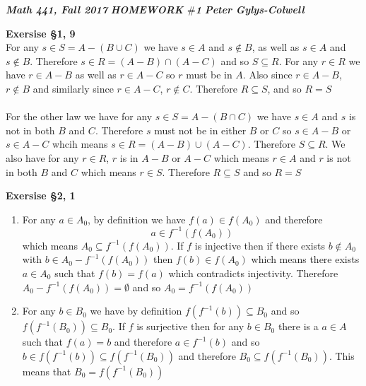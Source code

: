 \documentclass[12pt]{article}
\newenvironment{ques}[1]{\textbf{Exersise #1}\vspace{1 mm}\\ }{\bigskip}
\theoremstyle{definition}
\begin{document}
\noindent \textit{\textbf{Math 441, Fall 2017}} \hspace{1.3cm}
\textit{\textbf{HOMEWORK $\#$1}} \hspace{1.3cm} \textit{\textbf{Peter
Gylys-Colwell}} 

\vspace{1cm}

\begin{ques}{\S 1, 9}
	For any $s \in S = A - (B \cup C)$ we have $s \in A$ and $s \notin B$,
	as well as $s \in A$ and $s\notin B$. Therefore $s \in R = (A - B) \cap
	(A - C)$ and so $S \subseteq R$. For any $r \in R$ we have $r \in A -
	B$ as well as $r \in A-C$ so $r$ must be in $A$. Also since $r \in
	A-B$, $r \notin B$ and similarly since $r \in A-C$, $r\notin C$.
	Therefore $R \subseteq S$, and so $R = S$\\ 
	\\
	For the other law we have
	for any $s \in S = A- (B\cap C)$ we have $s \in A$ and $s$ is not in
	both $B$ and $C$. Therefore $s$ must not be in either $B$ or $C$ so $s
	\in A-B$ or $s \in A-C$ whcih means $s \in R = (A-B)\cup (A-C)$.
	Therefore $S \subseteq R$. We also have for any $r \in R$, $r$ is in $A
	- B$ or $A -C$ which means $r \in A$ and $r$ is not in both $B$ and $C$
	which means $r \in S$. Therefore $R \subseteq S$ and so $R = S$

\end{ques}

\begin{ques}{\S 2, 1}
	\begin{enumerate}
		\item
			For any $a \in A_0$, by definition we have $f(a) \in f(A_0)$ and therefore 
			$$a \in f^{-1}(f(A_0))$$
			which means $A_0 \subseteq f^{-1}(f(A_0))$. If $f$ is
			injective then if there exists $b \notin A_0$ with $b
			\in A_0 - f^{-1}(f(A_0))$ then $f(b) \in f(A_0)$ which
			means there exists $a \in A_0$ such that $f(b) = f(a)$
			which contradicts injectivity. Therefore $A_0 -
			f^{-1}(f(A_0)) = \emptyset$ and so $A_0 =
			f^{-1}(f(A_0))$

		\item
			For any $b \in B_0$ we have by definition $f(f^{-1}(b))
			\subseteq B_0$ and so $f(f^{-1}(B_0)) \subseteq B_0$.
			If $f$ is surjective then for any $b \in B_0$ there is
			a $a \in A$ such that $f(a) = b$ and therefore $a \in
			f^{-1}(b)$ and so $b \in f(f^{-1}(b)) \subseteq
			f(f^{-1}(B_0))$ and therefore $B_0 \subseteq
			f(f^{-1}(B_0))$. This means that $B_0 = f(f^{-1}(B_0))$

	\end{enumerate}
\end{ques}
\end{document}
